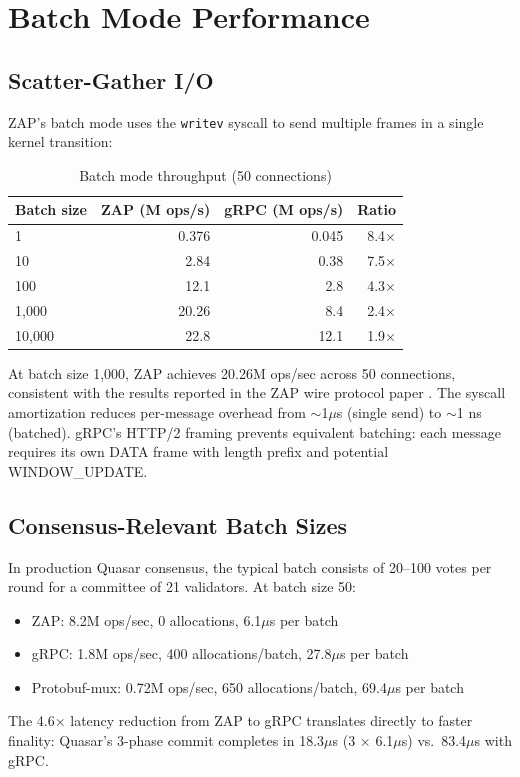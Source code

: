 \section{Batch Mode Performance}


\subsection{Scatter-Gather I/O}

ZAP's batch mode uses the \texttt{writev} syscall to send multiple frames in a single kernel transition:

\begin{table}[h]
\centering
\caption{Batch mode throughput (50 connections)}
\label{tab:batch}
\begin{tabular}{lrrr}
\toprule
\textbf{Batch size} & \textbf{ZAP (M ops/s)} & \textbf{gRPC (M ops/s)} & \textbf{Ratio} \\
\midrule
1 & 0.376 & 0.045 & 8.4$\times$ \\
10 & 2.84 & 0.38 & 7.5$\times$ \\
100 & 12.1 & 2.8 & 4.3$\times$ \\
1,000 & 20.26 & 8.4 & 2.4$\times$ \\
10,000 & 22.8 & 12.1 & 1.9$\times$ \\
\bottomrule
\end{tabular}
\end{table}

At batch size 1,000, ZAP achieves 20.26M ops/sec across 50 connections, consistent with the results reported in the ZAP wire protocol paper \cite{zapwire}. The syscall amortization reduces per-message overhead from $\sim$1$\mu$s (single send) to $\sim$1 ns (batched). gRPC's HTTP/2 framing prevents equivalent batching: each message requires its own DATA frame with length prefix and potential WINDOW\_UPDATE.

\subsection{Consensus-Relevant Batch Sizes}

In production Quasar consensus, the typical batch consists of 20--100 votes per round for a committee of 21 validators. At batch size 50:

\begin{itemize}
\item ZAP: 8.2M ops/sec, 0 allocations, 6.1$\mu$s per batch
\item gRPC: 1.8M ops/sec, 400 allocations/batch, 27.8$\mu$s per batch
\item Protobuf-mux: 0.72M ops/sec, 650 allocations/batch, 69.4$\mu$s per batch
\end{itemize}

The 4.6$\times$ latency reduction from ZAP to gRPC translates directly to faster finality: Quasar's 3-phase commit completes in 18.3$\mu$s (3 $\times$ 6.1$\mu$s) vs.\ 83.4$\mu$s with gRPC.

